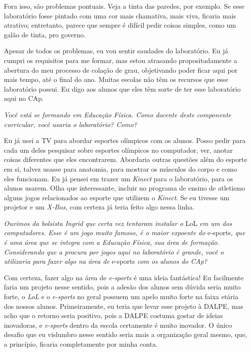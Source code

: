 Fora isso, são problemas pontuais. Veja a tinta das paredes, por exemplo. Se esse laboratório fosse pintado com uma cor mais chamativa, mais viva, ficaria mais atrativo; entretanto, parece que sempre é difícil pedir coisas simples, como um galão de tinta, pro governo.

Apesar de todos os problemas, eu vou sentir saudades do laboratório. Eu já cumpri os requisitos para me formar, mas estou atrasando propositadamente a abertura do meu processo de colação de grau, objetivando poder ficar aqui por mais tempo, até o final do ano. Muitas escolas não têm os recursos que esse laboratório possui. Eu digo aos alunos que eles têm sorte de ter esse laboratório aqui no CAp.

\textit{Você está se formando em Educação Física. Como docente deste componente curricular, você usaria o laboratório? Como?}

Eu já usei a TV para abordar esportes olímpicos com os alunos. Posso pedir para cada um deles pesquisar sobre esportes olímpicos no computador, ver, anotar coisas diferentes que eles encontrarem. Abordaria outras questões além do esporte em si, talvez usasse para anatomia, para mostrar os músculos do corpo e como eles funcionam. Eu já pensei em trazer um \textit{Kinect} para o laboratório, para os alunos usarem. Olha que interessante, incluir no programa de ensino de atletismo alguns jogos relacionados ao esporte que utilizem o \textit{Kinect}. Se eu tivesse um projetor e um \textit{X-Box}, com certeza já teria feito algo nessa linha.

\textit{Ouvimos da bolsista Ingrid que certa vez tentaram instalar o} LoL \textit{em um dos computadores. Esse é um jogo muito famoso, é o maior expoente do} e-sports\textit{, que é uma área que se integra com a Educação Física, sua área de formação. Considerando que a procura por jogos aqui no laboratório é grande, você o utilizaria para fazer algo na área de} e-sports \textit{com os alunos do CAp?}

Com certeza, fazer algo na área de \textit{e-sports} é uma ideia fantástica! Eu facilmente faria um projeto nesse sentido, pois a adesão dos alunos sem dúvida seria muito forte, o \textit{LoL} e o \textit{e-sports} no geral possuem um apelo muito forte na faixa etária dos nossos alunos. Primeiramente, eu teria que levar esse projeto à DALPE, mas acho que o retorno seria positivo, pois a DALPE costuma gostar de ideias inovadoras, e \textit{e-sports} dentro da escola certamente é muito inovador. O único desafio que eu vislumbro nesse sentido seria mais a organização geral mesmo, que, a princípio, ficaria completamente por minha conta.

